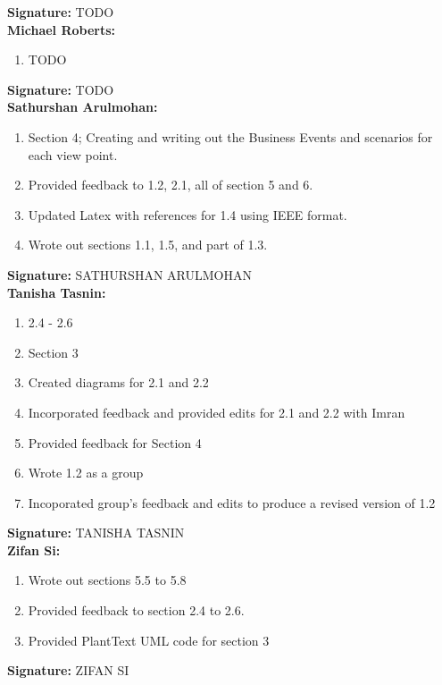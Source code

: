 \documentclass[]{article}
\begin{document}
\textbf{Signature:} TODO \\

\textbf{Michael Roberts:}
\begin{enumerate}
	\item TODO
\end{enumerate}

\textbf{Signature:} TODO \\

\textbf{Sathurshan Arulmohan:}
\begin{enumerate}
	\item Section 4; Creating and writing out the Business Events and scenarios for each view point.
	\item Provided feedback to 1.2, 2.1, all of section 5 and 6.
	\item Updated Latex with references for 1.4 using IEEE format.
	\item Wrote out sections 1.1, 1.5, and part of 1.3.
\end{enumerate}

\textbf{Signature:} SATHURSHAN ARULMOHAN \\

\textbf{Tanisha Tasnin:}
\begin{enumerate}
	\item 2.4 - 2.6
	\item Section 3
	\item Created diagrams for 2.1 and 2.2
	\item Incorporated feedback and provided edits for 2.1 and 2.2 with Imran
	\item Provided feedback for Section 4
	\item Wrote 1.2 as a group
	\item Incoporated group's feedback and edits to produce a revised version of 1.2
\end{enumerate}

\textbf{Signature:} TANISHA TASNIN \\

\textbf{Zifan Si:}
\begin{enumerate}
	\item Wrote out sections 5.5 to 5.8
	\item Provided feedback to section 2.4 to 2.6.
	\item Provided PlantText UML code for section 3
\end{enumerate}

\textbf{Signature:} ZIFAN SI  \\

\end{document}

